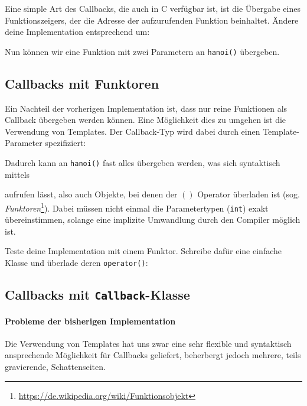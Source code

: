 Eine simple Art des Callbacks, die auch in C verfügbar ist, ist die Übergabe eines Funktionszeigers, der die Adresse der aufzurufenden Funktion beinhaltet.
Ändere deine Implementation entsprechend um:



Nun können wir eine Funktion mit zwei Parametern an \lstinline{hanoi()} übergeben.



\subsection{Callbacks mit Funktoren}
Ein Nachteil der vorherigen Implementation ist, dass nur reine Funktionen als Callback übergeben werden können.
Eine Möglichkeit dies zu umgehen ist die Verwendung von Templates.
Der Callback-Typ wird dabei durch einen Template-Parameter spezifiziert:



Dadurch kann an \lstinline{hanoi()} fast alles übergeben werden, was sich syntaktisch mittels



aufrufen lässt, also auch Objekte, bei denen der $()$ Operator überladen ist (sog. \emph{Funktoren}\footnote{\url{https://de.wikipedia.org/wiki/Funktionsobjekt}}).
Dabei müssen nicht einmal die Parametertypen (\lstinline{int}) exakt übereinstimmen, solange eine implizite Umwandlung durch den Compiler möglich ist.

Teste deine Implementation mit einem Funktor.
Schreibe dafür eine einfache Klasse und überlade deren \lstinline{operator()}:



\subsection{Callbacks mit \lstinline{Callback}-Klasse}

\paragraph*{Probleme der bisherigen Implementation}
Die Verwendung von Templates hat uns zwar eine sehr flexible und syntaktisch ansprechende Möglichkeit für Callbacks geliefert, beherbergt jedoch mehrere, teils gravierende, Schattenseiten.

